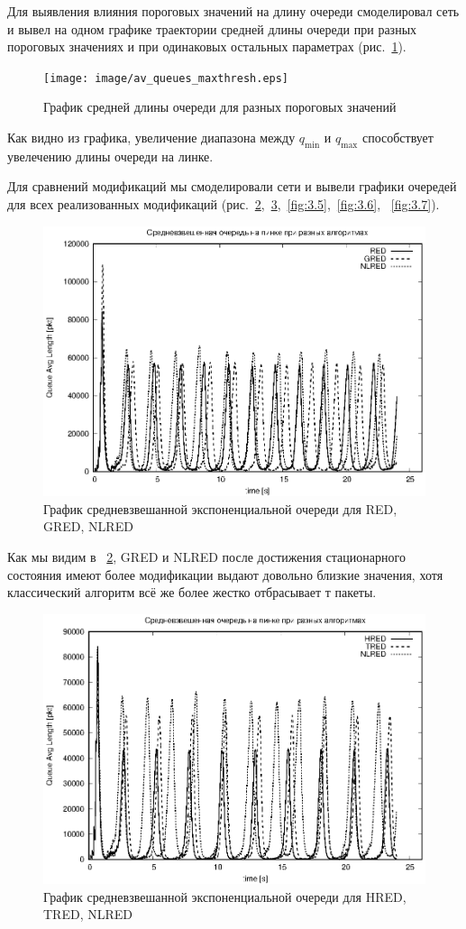 Для выявления влияния пороговых значений на длину очереди смоделировал
сеть и вывел на одном графике траектории  средней длины очереди при разных
пороговых значениях и при одинаковых остальных параметрах
(рис.~\ref{fig:3.2}).

\begin{figure}[!ht]
  \centering
  \texttt{[image: image/av\_queues\_maxthresh.eps]}
  \caption{График средней длины очереди для разных пороговых значений}
  \label{fig:3.2}
\end{figure}

Как видно из графика,
увеличение диапазона между $q_{\min}$ и $q_{\max}$ способствует
увелечению длины очереди на линке.

Для сравнений модификаций мы смоделировали сети и вывели графики очередей для всех реализованных модификаций
(рис.~\ref{fig:3.3},~\ref{fig:3.4},~\ref{fig:3.5},~\ref{fig:3.6}, ~\ref{fig:3.7}).


\begin{figure}[!ht]
  \centering
  \includegraphics[width=0.7\linewidth]{image/av_queues_1GNl.eps}
  \caption{График средневзвешанной экспоненциальной очереди для RED, GRED, NLRED}
  \label{fig:3.3}
\end{figure}

Как мы видим в ~\ref{fig:3.3}, GRED и NLRED после достижения стационарного состояния имеют более модификации выдают довольно близкие значения, хотя классический алгоритм всё же более жестко отбрасывает т пакеты.

\begin{figure}[!ht]
  \centering
  \includegraphics[width=0.7\linewidth]{image/av_queues_HTNl.eps}
  \caption{График средневзвешанной экспоненциальной очереди для HRED, TRED, NLRED}
  \label{fig:3.4}
\end{figure}

